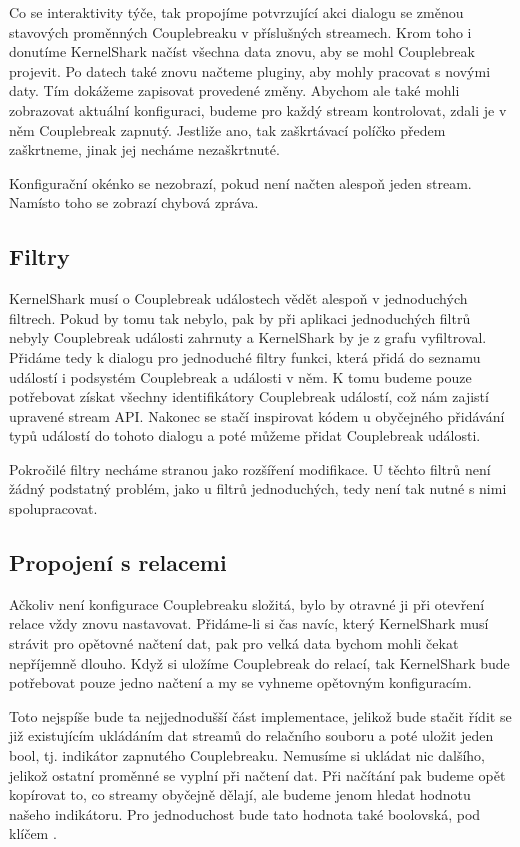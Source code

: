 Co se interaktivity týče, tak propojíme potvrzující akci dialogu se změnou stavových proměnných Couplebreaku v příslušných streamech. Krom toho i donutíme KernelShark načíst všechna data znovu, aby se mohl Couplebreak projevit. Po datech také znovu načteme pluginy, aby mohly pracovat s novými daty. Tím dokážeme zapisovat provedené změny. Abychom ale také mohli zobrazovat aktuální konfiguraci, budeme pro každý stream kontrolovat, zdali je v něm Couplebreak zapnutý. Jestliže ano, tak zaškrtávací políčko předem zaškrtneme, jinak jej necháme nezaškrtnuté.

Konfigurační okénko se nezobrazí, pokud není načten alespoň jeden stream. Namísto toho se zobrazí chybová zpráva.

\subsection{Filtry}
KernelShark musí o Couplebreak událostech vědět alespoň v jednoduchých filtrech. Pokud by tomu tak nebylo, pak by při aplikaci jednoduchých filtrů nebyly Couplebreak události zahrnuty a KernelShark by je z grafu vyfiltroval. Přidáme tedy k dialogu pro jednoduché filtry funkci, která přidá do seznamu událostí i podsystém Couplebreak a události v něm. K tomu budeme pouze potřebovat získat všechny identifikátory Couplebreak událostí, což nám zajistí upravené stream API. Nakonec se stačí inspirovat kódem u obyčejného přidávání typů událostí do tohoto dialogu a poté můžeme přidat Couplebreak události.

Pokročilé filtry necháme stranou jako rozšíření modifikace. U těchto filtrů není žádný podstatný problém, jako u filtrů jednoduchých, tedy není tak nutné s nimi spolupracovat.

\subsection{Propojení s relacemi}
Ačkoliv není konfigurace Couplebreaku složitá, bylo by otravné ji při otevření relace vždy znovu nastavovat. Přidáme-li si čas navíc, který KernelShark musí strávit pro opětovné načtení dat, pak pro velká data bychom mohli čekat nepříjemně dlouho. Když si uložíme Couplebreak do relací, tak KernelShark bude potřebovat pouze jedno načtení a my se vyhneme opětovným konfiguracím.

Toto nejspíše bude ta nejjednodušší část implementace, jelikož bude stačit řídit se již existujícím ukládáním dat streamů do relačního souboru a poté uložit jeden bool, tj. indikátor zapnutého Couplebreaku. Nemusíme si ukládat nic dalšího, jelikož ostatní proměnné se vyplní při načtení dat. Při načítání pak budeme opět kopírovat to, co streamy obyčejně dělají, ale budeme jenom hledat hodnotu našeho indikátoru. Pro jednoduchost bude tato hodnota také boolovská, pod klíčem .

